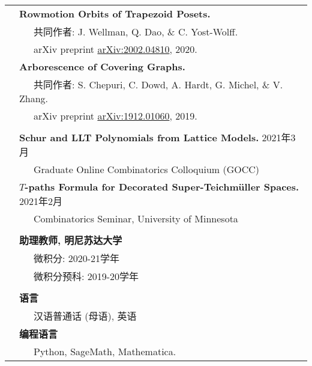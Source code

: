 \documentclass[A4paper, 11pt, utf8, AutoFakeBold]{ctexart}
\newcommand{\mycolor}[0]{\color{RoyalBlue}}
\begin{document}
\begin{longtable}{p{1.5in}p{4.9in}}
& {\textbf{Rowmotion Orbits of Trapezoid Posets.} } \\
&\ \ \ 共同作者: J. Wellman, Q. Dao, \& C. Yost-Wolff.\\
&\ \ \ arXiv preprint \href{https://arxiv.org/abs/2002.04810}{arXiv:2002.04810}, 2020.\\

&\textbf{Arborescence of Covering Graphs.} \\
&\ \ \ 共同作者: S. Chepuri, C. Dowd, A. Hardt, G. Michel, \& V. Zhang.\\
&\ \ \  arXiv preprint \href{https://arxiv.org/abs/1912.01060}{arXiv:1912.01060}, 2019.\\
& \\

{\mycolor{\bfseries 会议和讲座}} 
& \textbf{Schur and LLT Polynomials from Lattice Models.} \hfill 2021年3月 \\
&\ \ \ Graduate Online Combinatorics Colloquium (GOCC) \\
& \textbf{$T$-paths Formula for Decorated Super-Teichm\"uller Spaces.} \hfill 2021年2月 \\
&\ \ \ Combinatorics Seminar, University of Minnesota \\

& \\




{\mycolor{\bfseries 教学经验}} 
& \textbf{助理教师, 明尼苏达大学}  \\
&\ \ \ 微积分: 2020-21学年\\
&\ \ \ 微积分预科: 2019-20学年 \\

& \\



{\mycolor{\bfseries 技能}} 
& \textbf{语言} \\
&\ \ \ 汉语普通话 (母语), 英语 \\
& \textbf{编程语言}\\
&\ \ \ Python, SageMath, Mathematica. \\

\end{longtable}
\end{document}
